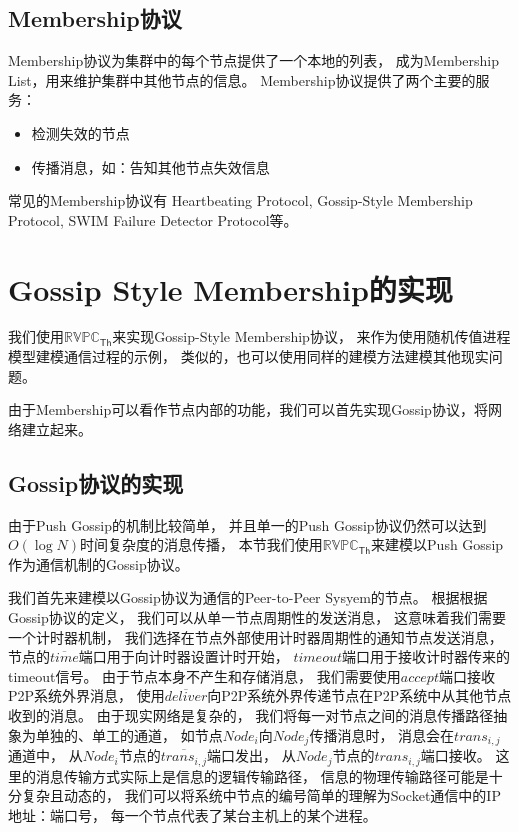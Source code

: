 \subsection{Membership协议}

Membership协议为集群中的每个节点提供了一个本地的列表，
成为Membership List，用来维护集群中其他节点的信息。
Membership协议提供了两个主要的服务：
\begin{itemize}
   \item 检测失效的节点
   \item 传播消息，如：告知其他节点失效信息
\end{itemize}

常见的Membership协议有
Heartbeating Protocol, 
Gossip-Style Membership Protocol, 
SWIM Failure Detector Protocol等。

\section{Gossip Style Membership的实现}
我们使用$\mathbb{RVPC}_{\mathsf{Th}}$来实现Gossip-Style Membership协议，
来作为使用随机传值进程模型建模通信过程的示例，
类似的，也可以使用同样的建模方法建模其他现实问题。

由于Membership可以看作节点内部的功能，我们可以首先实现Gossip协议，将网络建立起来。

\subsection{Gossip协议的实现}\label{ch:gossip_impl}
由于Push Gossip的机制比较简单，
并且单一的Push Gossip协议仍然可以达到$O(\log N)$时间复杂度的消息传播，
本节我们使用$\mathbb{RVPC}_{\mathsf{Th}}$来建模以Push Gossip作为通信机制的Gossip协议。

我们首先来建模以Gossip协议为通信的Peer-to-Peer Sysyem的节点。
根据根据Gossip协议的定义，
我们可以从单一节点周期性的发送消息，
这意味着我们需要一个计时器机制，
我们选择在节点外部使用计时器周期性的通知节点发送消息，
节点的$\overline{time}$端口用于向计时器设置计时开始，
$timeout$端口用于接收计时器传来的timeout信号。
由于节点本身不产生和存储消息，
我们需要使用$accept$端口接收P2P系统外界消息，
使用$\overline{deliver}$向P2P系统外界传递节点在P2P系统中从其他节点收到的消息。
由于现实网络是复杂的，
我们将每一对节点之间的消息传播路径抽象为单独的、单工的通道，
如节点$Node_i$向$Node_j$传播消息时，
消息会在$trans_{i,j}$通道中，
从$Node_i$节点的$\overline{trans_{i,j}}$端口发出，
从$Node_j$节点的$trans_{i,j}$端口接收。
这里的消息传输方式实际上是信息的逻辑传输路径，
信息的物理传输路径可能是十分复杂且动态的，
我们可以将系统中节点的编号简单的理解为Socket通信中的IP地址：端口号，
每一个节点代表了某台主机上的某个进程。

